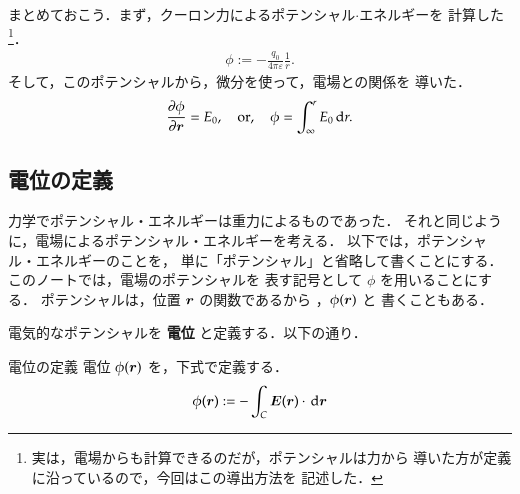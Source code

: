             まとめておこう．まず，クーロン力によるポテンシャル$\cdot$エネルギーを
            計算した
                \footnote{
                    実は，電場からも計算できるのだが，ポテンシャルは力から
                    導いた方が定義に沿っているので，今回はこの導出方法を
                    記述した．
                }．
                \begin{align}
                    \phi := -\frac{q_{0}}{4 \pi \varepsilon} \frac{1}{r}.
                \end{align}
            そして，このポテンシャルから，微分を使って，電場との関係を
            導いた．
                \begin{align*}
                    \frac{\partial \phi}{\partial \boldsymbol{r}} = E_{0}
                    , \quad \mathrm{or}, \quad
                    \phi = \int_{\infty}^{r} E_{0} \,\mathrm{d} r.
                \end{align*}


        \subsection{電位の定義}
            力学でポテンシャル・エネルギーは重力によるものであった．
            それと同じように，電場によるポテンシャル・エネルギーを考える．
            以下では，ポテンシャル・エネルギーのことを，
            単に「ポテンシャル」と省略して書くことにする．このノートでは，電場のポテンシャルを
            表す記号として $\phi$ を用いることにする．
            ポテンシャルは，位置 $\boldsymbol{r}$ の関数であるから
            ，$\phi(\boldsymbol{r})$ と
            書くこともある．

            電気的なポテンシャルを \textbf{電位} と定義する．以下の通り．
                \begin{myshadebox}{電位の定義}
                    電位 $\phi(\boldsymbol{r})$ を，下式で定義する．
                    \begin{align}
                        \phi(\boldsymbol{r}) := -\int_{C} \boldsymbol{E}(\boldsymbol{r}) \cdot \,\mathrm{d}\boldsymbol{r}
                    \end{align}
                \end{myshadebox}



